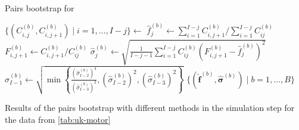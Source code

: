 \documentclass[a4paper]{book}
\begin{document}
\begin{algorithm}[!htb]
  \caption{Pairs bootstrap for }
  \label{alg:pairs-mack}
  \begin{algorithmic}
        \vspace{5pt}
        \State $\{ (C^{(b)}_{i, j}, C^{(b)}_{i, j + 1}) \mid i = 1, \dots, I - j \} \gets$ 
        \vspace{5pt}
        \State $\widehat{f}^{(b)}_j \gets \sum_{i = 1}^{I - j} C^{(b)}_{i, j + 1} / \sum_{i = 1}^{I - j} C^{(b)}_{ij}$
        \vspace{5pt}
          \State $F^{(b)}_{i, j + 1} \gets C^{(b)}_{i, j + 1} / C^{(b)}_{ij}$
          \vspace{5pt}
        \EndFor
          \State $\widehat{\sigma}^{(b)}_j \gets \sqrt{\frac{1}{I - j - 1}\sum_{i = 1}^{I-j} C^{(b)}_{ij}\left( F^{(b)}_{i, j + 1} - \widehat{f}^{(b)}_j \right)^2}$
        \Else
          \State $\widehat{\sigma}^{(b)}_{I - 1} \gets \sqrt{\min{ \left \{ \frac{(\widehat{\sigma}^{(b)}_{I - 2})^4}{(\widehat{\sigma}^{(b)}_{I - 3})^2}, (\widehat{\sigma}^{(b)}_{I - 2})^2, (\widehat{\sigma}^{(b)}_{I - 3})^2 \right \} }}$
        \EndIf
      \EndFor
    \EndFor
    \State \Return $\{ (\widehat{\bm{f}}^{(b)}, \widehat{\bm{\sigma}}^{(b)}) \mid b = 1, \dots, B \}$
  \end{algorithmic}
\end{algorithm}

\begin{table}[!htb]
  \begin{subtable}{0.5\linewidth}
    
  \end{subtable}
  \hfill
  \begin{subtable}{0.5\linewidth}
    
  \end{subtable}
  \caption{Results of the pairs bootstrap with different methods in the simulation step for the data from \cref{tab:uk-motor}}
  \label{tab:mack-pairs}
\end{table}
\end{document}
